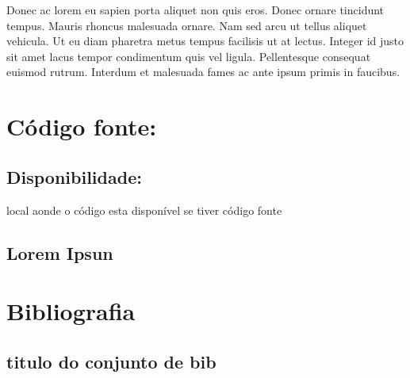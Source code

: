 \documentclass[11pt, a4paper]{article} %
\begin{document}
Donec ac lorem eu sapien porta aliquet non quis eros. Donec ornare tincidunt tempus. Mauris rhoncus malesuada ornare. Nam sed arcu ut tellus aliquet vehicula. Ut eu diam pharetra metus tempus facilisis ut at lectus. Integer id justo sit amet lacus tempor condimentum quis vel ligula. Pellentesque consequat euismod rutrum. Interdum et malesuada fames ac ante ipsum primis in faucibus.


\newpage
\section{Código fonte:}
\renewcommand\lstlistingname{Arquivo número}
\subsection{Disponibilidade:} %
local aonde o código esta disponível se tiver código fonte
\textcolor{white}{.}\par

\subsection{Lorem Ipsun} %




\newpage %
\section{Bibliografia}

\subsection{titulo do conjunto de bib} %



\end{document}
